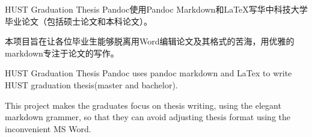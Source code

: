 \zhabstract
{
HUST Graduation Thesis Pandoc使用Pandoc Markdown和LaTeX写华中科技大学毕业论文（包括硕士论文和本科论文）。

本项目旨在让各位毕业生能够脱离用Word编辑论文及其格式的苦海，用优雅的markdown专注于论文的写作。
}

\enabstract
{
HUST Graduation Thesis Pandoc uses pandoc markdown and LaTex to write HUST graduation thesis(master and bachelor).

This project makes the graduates focus on thesis writing, using the elegant markdown grammer, so that they can avoid adjusting thesis format using the inconvenient MS Word.
}
